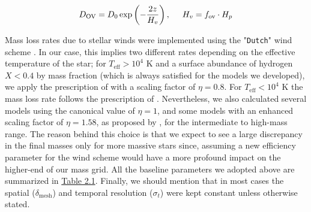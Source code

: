 \documentclass[../../main/thesis_msc.tex]{subfiles}
\begin{document}
    					\begin{eqnarray}
    						\label{eq:OV_diff}
    						D_{\text{OV}} = D_0 \exp \left( - \frac{2z}{H_v} \right), \hspace{0.5cm} H_v = f_{\text{ov}} \cdot H_p
    					\end{eqnarray}
    					
    					Mass loss rates due to stellar winds were implemented using the "\texttt{Dutch}" wind scheme \citep{Dutch}. In our case, this implies two different rates depending on the effective temperature of the star; for $T_{\text{eff}} > 10^4$ K and a surface abundance of hydrogen $X < 0.4$ by mass fraction (which is always satisfied for the models we developed), we apply the prescription of \cite{Nugis2000} with a scaling factor of $\eta = 0.8$. For $T_{\text{eff}} < 10^4$ K the mass loss rate follows the prescription of \cite{deJager1988}.
    					Nevertheless, we also calculated several models using the canonical value of $\eta = 1$, and some models with an enhanced scaling factor of $\eta = 1.58$, as proposed by \cite{yoon17}, for the intermediate to high-mass range. The reason behind this choice is that we expect to see a large discrepancy in the final masses only for more massive stars since, assuming a new efficiency parameter for the wind scheme would have a more profound impact on the higher-end of our mass grid.
    					 All the baseline parameters we adopted above are summarized in \hyperref[tab:parameters_single]{Table 2.1}. Finally, we should mention that in most cases the spatial ($\delta_{\text{mesh}}$) and temporal resolution ($\sigma_t$) were kept constant unless otherwise stated.
    					
\end{document}
